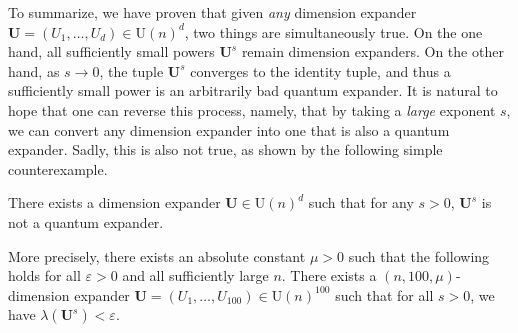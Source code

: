 \documentclass{toc}
\theoremstyle{plain}
\numberwithin{equation}{section}
\theoremstyle{definition}
\newcommand{\U}{\mathrm{U}}
\newcommand{\tuple}[1]{\mathbf{#1}}
\newcommand{\vU}{\tuple{U}}
\begin{document}
To summarize, we have proven that given \emph{any} dimension expander $\vU=(U_1,\dots,U_d) \in \U(n)^d$, two things are simultaneously true. On the one hand, all sufficiently small powers $\vU^s$ remain dimension expanders. On the other hand, as $s \to 0$, the tuple $\vU^s$ converges to the identity tuple, and thus a sufficiently small power is an arbitrarily bad quantum expander. It is natural to hope that one can 
%
reverse
%
this
%
process,  %
namely, that by taking a \emph{large} %
exponent $s$,  %
we can convert any dimension expander into one that is also a quantum expander. Sadly, this is also not true, as shown by the following simple counterexample. 
\begin{proposition}
  There exists %
a  %
dimension expander $\vU \in \U(n)^d$ such that for any $s>0$, ${\vU^s}$ is not a quantum expander. 

    More precisely, there exists an absolute constant $\mu >0$ such that the following holds for all $\varepsilon>0$ and all sufficiently large $n$. There exists a $(n,100,\mu)$-dimension expander $\vU = (U_1,\dots,U_{100}) \in \U(n)^{100}$ such that for all $s>0$, we have $\lambda({\vU^s})< \varepsilon$.
\end{proposition}
\end{document}
